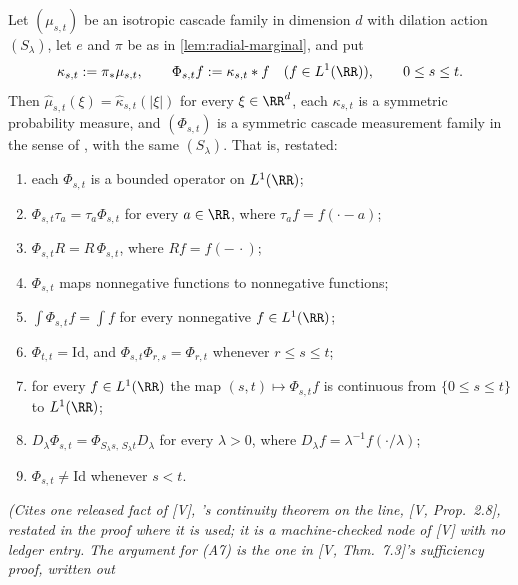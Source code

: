\begin{lemma}
\label{lem:isotropic-marginal-family}
\leanok
{}
Let $(\mu_{s,t})$ be an isotropic cascade family in dimension $d$ with dilation action
$(S_\lambda)$, let $e$ and $\pi$ be as in \ref{lem:radial-marginal}, and put
\[
  \kappa_{s,t} := \pi_*\mu_{s,t}, \qquad \Phi_{s,t}f := \kappa_{s,t} * f
  \quad (f \in L^1(\RR)), \qquad 0 \le s \le t .
\]
Then $\widehat\mu_{s,t}(\xi) = \widehat\kappa_{s,t}(|\xi|)$ for every $\xi \in \RR^d$, each
$\kappa_{s,t}$ is a symmetric probability measure, and $(\Phi_{s,t})$ is a symmetric cascade
measurement family in the sense of , with the same $(S_\lambda)$. That is, restated:
\begin{enumerate}
\item[(A1)] each $\Phi_{s,t}$ is a bounded operator on $L^1(\RR)$;
\item[(A2)] $\Phi_{s,t}\tau_a = \tau_a\Phi_{s,t}$ for every $a \in \RR$, where
$\tau_af = f(\cdot - a)$;
\item[(A3)] $\Phi_{s,t}R = R\,\Phi_{s,t}$, where $Rf = f(-\,\cdot)$;
\item[(A4)] $\Phi_{s,t}$ maps nonnegative functions to nonnegative functions;
\item[(A5)] $\int\Phi_{s,t}f = \int f$ for every nonnegative $f \in L^1(\RR)$;
\item[(A6)] $\Phi_{t,t} = \mathrm{Id}$, and $\Phi_{s,t}\Phi_{r,s} = \Phi_{r,t}$ whenever
$r \le s \le t$;
\item[(A7)] for every $f \in L^1(\RR)$ the map $(s,t) \mapsto \Phi_{s,t}f$ is continuous from
$\{0 \le s \le t\}$ to $L^1(\RR)$;
\item[(A8)] $D_\lambda\Phi_{s,t} = \Phi_{S_\lambda s,\,S_\lambda t}D_\lambda$ for every
$\lambda > 0$, where $D_\lambda f = \lambda^{-1}f(\cdot/\lambda)$;
\item[(ND)] $\Phi_{s,t} \ne \mathrm{Id}$ whenever $s < t$.
\end{enumerate}
\statusT\quad\emph{(Cites one released fact of [V], \Levy's continuity theorem on the line,
[V, Prop.~2.8], restated in the proof where it is used; it is a machine-checked node of [V] with no
ledger entry. The argument for (A7) is the one in [V, Thm.~7.3]'s sufficiency proof, written out
}
\end{lemma}
